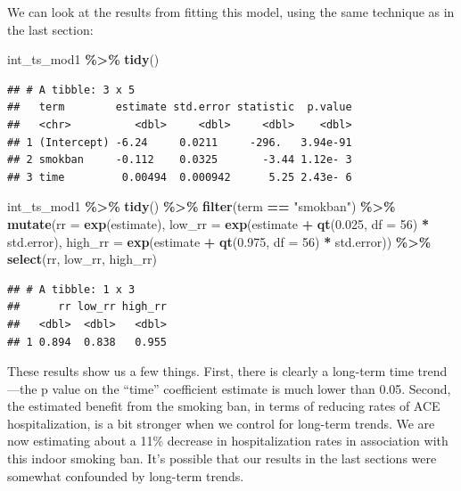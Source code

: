 \documentclass[
]{book}
\newenvironment{Shaded}{\begin{snugshade}}{\end{snugshade}}
\newcommand{\AttributeTok}[1]{\textcolor[rgb]{0.13,0.29,0.53}{#1}}
\newcommand{\DecValTok}[1]{\textcolor[rgb]{0.00,0.00,0.81}{#1}}
\newcommand{\FloatTok}[1]{\textcolor[rgb]{0.00,0.00,0.81}{#1}}
\newcommand{\FunctionTok}[1]{\textcolor[rgb]{0.13,0.29,0.53}{\textbf{#1}}}
\newcommand{\NormalTok}[1]{#1}
\newcommand{\SpecialCharTok}[1]{\textcolor[rgb]{0.81,0.36,0.00}{\textbf{#1}}}
\newcommand{\StringTok}[1]{\textcolor[rgb]{0.31,0.60,0.02}{#1}}
\begin{document}
We can look at the results from fitting this model, using the same technique as in the last section:

\begin{Shaded}
\begin{Highlighting}[]
\NormalTok{int\_ts\_mod1 }\SpecialCharTok{\%\textgreater{}\%} 
  \FunctionTok{tidy}\NormalTok{()}
\end{Highlighting}
\end{Shaded}

\begin{verbatim}
## # A tibble: 3 x 5
##   term        estimate std.error statistic  p.value
##   <chr>          <dbl>     <dbl>     <dbl>    <dbl>
## 1 (Intercept) -6.24     0.0211     -296.   3.94e-91
## 2 smokban     -0.112    0.0325       -3.44 1.12e- 3
## 3 time         0.00494  0.000942      5.25 2.43e- 6
\end{verbatim}

\begin{Shaded}
\begin{Highlighting}[]
\NormalTok{int\_ts\_mod1 }\SpecialCharTok{\%\textgreater{}\%} 
  \FunctionTok{tidy}\NormalTok{() }\SpecialCharTok{\%\textgreater{}\%} 
  \FunctionTok{filter}\NormalTok{(term }\SpecialCharTok{==} \StringTok{"smokban"}\NormalTok{) }\SpecialCharTok{\%\textgreater{}\%} 
  \FunctionTok{mutate}\NormalTok{(}\AttributeTok{rr =} \FunctionTok{exp}\NormalTok{(estimate), }
         \AttributeTok{low\_rr =} \FunctionTok{exp}\NormalTok{(estimate }\SpecialCharTok{+} \FunctionTok{qt}\NormalTok{(}\FloatTok{0.025}\NormalTok{, }\AttributeTok{df =} \DecValTok{56}\NormalTok{) }\SpecialCharTok{*}\NormalTok{ std.error), }
         \AttributeTok{high\_rr =} \FunctionTok{exp}\NormalTok{(estimate }\SpecialCharTok{+} \FunctionTok{qt}\NormalTok{(}\FloatTok{0.975}\NormalTok{, }\AttributeTok{df =} \DecValTok{56}\NormalTok{) }\SpecialCharTok{*}\NormalTok{ std.error)) }\SpecialCharTok{\%\textgreater{}\%} 
  \FunctionTok{select}\NormalTok{(rr, low\_rr, high\_rr)}
\end{Highlighting}
\end{Shaded}

\begin{verbatim}
## # A tibble: 1 x 3
##      rr low_rr high_rr
##   <dbl>  <dbl>   <dbl>
## 1 0.894  0.838   0.955
\end{verbatim}

These results show us a few things. First, there is clearly a long-term time trend---the p value on the ``time'' coefficient estimate is much lower than 0.05. Second, the estimated benefit from the smoking ban, in terms of reducing rates of ACE hospitalization, is a bit stronger when we control for long-term trends. We are now estimating about a 11\% decrease in hospitalization rates in association with this indoor smoking ban. It's possible that our results in the last sections were somewhat confounded by long-term trends.
\end{document}
